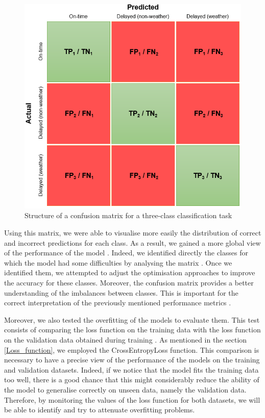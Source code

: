 \documentclass[12pt,oneside]{book} %
\begin{document}
\begin{figure}[H]
    \centering
    \includegraphics[width=0.75\linewidth]{Image/confusion_matrix_example.png}
    \caption{Structure of a confusion matrix for a three-class classification task}
    \label{fig:confusio,_matrix_example}
\end{figure}

\noindent Using this matrix, we were able to visualise more easily the distribution of correct and incorrect predictions for each class. As a result, we gained a more global view of the performance of the model \cite{Confusion_matrix1}. Indeed, we identified directly the classes for which the model had some difficulties by analysing the matrix \cite{Confusion_matrix2}. Once we identified them, we attempted to adjust the optimisation approaches to improve the accuracy for these classes. Moreover, the confusion matrix provides a better understanding of the imbalances between classes. This is important for the correct interpretation of the previously mentioned performance metrics \citep{Confusion_matrix1,Confusion_matrix2}.

\noindent Moreover, we also tested the overfitting of the models to evaluate them. This test consists of comparing the loss function on the training data with the loss function on the validation data obtained during training \cite{Overfitting}. As mentioned in the section \ref{Loss_function}, we employed the CrossEntropyLoss function. This comparison is necessary to have a precise view of the performance of the models on the training and validation datasets. Indeed, if we notice that the model fits the training data too well, there is a good chance that this might considerably reduce the ability of the model to generalise correctly on unseen data, namely the validation data. Therefore, by monitoring the values of the loss function for both datasets, we will be able to identify and try to attenuate overfitting problems.
\end{document}
